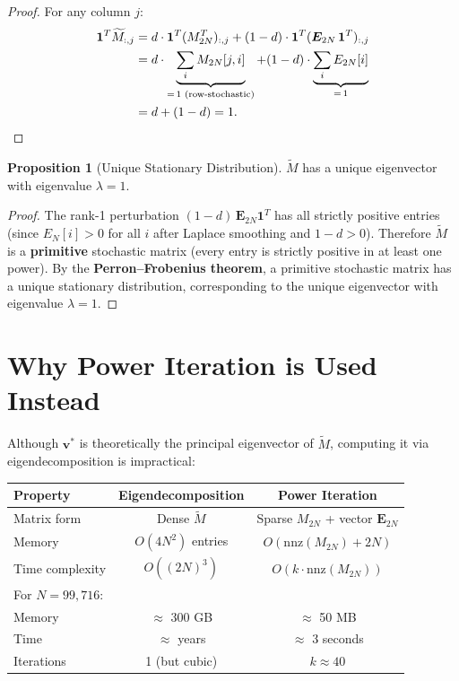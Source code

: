 \documentclass[11pt,a4paper]{article}
\theoremstyle{definition}
\newtheorem{proposition}{Proposition}
\begin{document}
\begin{proof}
For any column $j$:
\begin{align}
\bm{1}^T \widetilde{M}_{:,j}
&= d \cdot \bm{1}^T (M_{2N}^T)_{:,j}
 + (1-d) \cdot \bm{1}^T (\bm{E}_{2N}\,\bm{1}^T)_{:,j} \notag \\
&= d \cdot \underbrace{\sum_i M_{2N}[j,i]}_{=\,1\text{ (row-stochastic)}}
 + (1-d) \cdot \underbrace{\sum_i E_{2N}[i]}_{=\,1} \notag \\
&= d + (1-d) = 1. \qedhere
\end{align}
\end{proof}

\begin{proposition}[{Unique Stationary Distribution}]\label{prop:unique}
$\widetilde{M}$ has a unique eigenvector with eigenvalue $\lambda = 1$.
\end{proposition}

\begin{proof}
The rank-1 perturbation $(1-d)\,\bm{E}_{2N}\bm{1}^T$ has all strictly
positive entries (since $E_N[i] > 0$ for all $i$ after Laplace smoothing
and $1-d > 0$).  Therefore $\widetilde{M}$ is a \textbf{primitive}
stochastic matrix (every entry is strictly positive in at least one power).
By the \textbf{Perron--Frobenius theorem}, a primitive stochastic matrix
has a unique stationary distribution, corresponding to the unique
eigenvector with eigenvalue $\lambda = 1$.
\end{proof}

\section{Why Power Iteration is Used Instead}

Although $\bm{v}^*$ is theoretically the principal eigenvector of
$\widetilde{M}$, computing it via eigendecomposition is impractical:

\begin{center}
\renewcommand{\arraystretch}{1.3}
\begin{tabular}{lcc}
\hline
\textbf{Property} & \textbf{Eigendecomposition} & \textbf{Power Iteration} \\
\hline
Matrix form & Dense $\widetilde{M}$ & Sparse $M_{2N}$ + vector $\bm{E}_{2N}$ \\
Memory & $O(4N^2)$ entries & $O(\text{nnz}(M_{2N}) + 2N)$ \\
Time complexity & $O((2N)^3)$ & $O(k \cdot \text{nnz}(M_{2N}))$ \\
\hline
\multicolumn{3}{l}{\small For $N = 99{,}716$:} \\
Memory & $\approx$ 300 GB & $\approx$ 50 MB \\
Time & $\approx$ years & $\approx$ 3 seconds \\
Iterations & 1 (but cubic) & $k \approx 40$ \\
\hline
\end{tabular}
\end{center}
\end{document}
